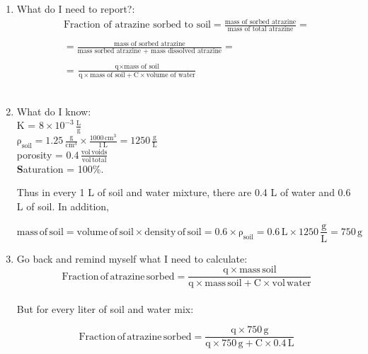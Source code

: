 \documentclass[12pt,letterpaper]{article}
\begin{document}
\begin{enumerate}
\begin{enumerate}
\item What do I need to report?:\\


\begin{multline*}
 \text{Fraction of atrazine sorbed to soil} = \frac{\text{mass of sorbed atrazine}}{\text{mass of total atrazine}} = \\\\ 
 = \frac{\text{mass of sorbed atrazine}}{\text{mass sorbed atrazine + mass dissolved atrazine}} = \\\\
 = \frac{\text{q}\times \text{mass of soil}}{\text{q}\times \text{mass of soil} + \text{C}\times \text{volume of water}}
\end{multline*}\\

\item What do I know:\\

K = $\mathrm{8 \times 10^{-3}\, \frac{L}{g}}$\\

$\mathrm{\rho_{soil} = 1.25\, \frac{g}{cm^3}\times \frac{1000\, cm^3}{1\, L} = 1250\, \frac{g}{L}}$\\

porosity = $\mathrm{0.4\, \frac{vol\, voids}{vol\, total}}$\\

\textbf{S}aturation = 100\%.

Thus in every 1 L of soil and water mixture, there are 0.4 L of water and 0.6 L of soil.  In addition,

\begin{equation*}
\mathrm{mass\, of\, soil = volume\, of\, soil\times density\, of\, soil = 0.6 \times \rho_{soil} = 0.6\, L \times 1250\, \frac{g}{L} = 750\, g}
\end{equation*}

\item Go back and remind myself what I need to calculate:\\

\begin{equation*}
\mathrm{Fraction\, of\,atrazine\, sorbed = \frac{q\times mass\, soil}{q\times mass\, soil + C\times vol\, water}}
\end{equation*}\\

But for every liter of soil and water mix:

\begin{equation*}
\mathrm{Fraction\, of\,atrazine\, sorbed = \frac{q\times 750\, g}{q\times 750\,g + C\times 0.4\, L}}
\end{equation*}\\


\end{enumerate}
\end{enumerate}
\end{document}
